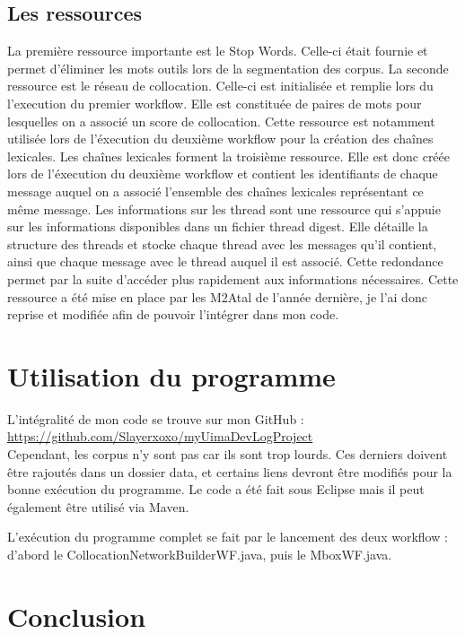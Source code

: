 \documentclass[a4paper]{article}
\begin{document}
	\subsection{Les ressources}
	La première ressource importante est le Stop Words. Celle-ci était fournie et permet d'éliminer les mots outils lors de la segmentation des corpus. 
La seconde ressource est le réseau de collocation. Celle-ci est initialisée et remplie lors du l'execution du premier workflow. Elle est constituée de paires de mots pour lesquelles on a associé un score de collocation. Cette ressource est notamment utilisée lors de l'éxecution du deuxième workflow pour la création des chaînes lexicales. 
Les chaînes lexicales forment la troisième ressource. Elle est donc créée lors de l'éxecution du deuxième workflow et contient les identifiants de chaque message auquel on a associé l'ensemble des chaînes lexicales représentant ce même message. 
Les informations sur les thread sont une ressource qui s’appuie sur les informations disponibles dans un fichier thread digest. Elle détaille la structure des threads et stocke chaque thread avec les messages qu’il contient, ainsi que chaque message avec le thread auquel il est associé. Cette redondance permet par la suite d’accéder plus rapidement aux informations nécessaires. Cette ressource a été mise en place par les M2Atal de l'année dernière, je l'ai donc reprise et modifiée afin de pouvoir l'intégrer dans mon code.
	
	
	\section{Utilisation du programme}

	L'intégralité de mon code se trouve sur mon GitHub : \url{https://github.com/Slayerxoxo/myUimaDevLogProject}\\
	
Cependant, les corpus n'y sont pas car ils sont trop lourds. Ces derniers doivent être rajoutés dans un dossier data, et certains liens devront être modifiés pour la bonne exécution du programme. Le code a été fait sous Eclipse mais il peut également être utilisé via Maven. 

L'exécution du programme complet se fait par le lancement des deux workflow : d'abord le CollocationNetworkBuilderWF.java, puis le MboxWF.java.


	\section*{Conclusion}
\end{document}
